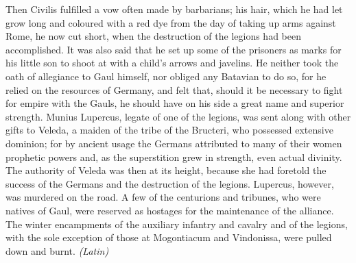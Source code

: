 
Then Civilis fulfilled a vow often made by barbarians; his hair, which he had let grow long and coloured with a red dye from the day of taking up arms against Rome, he now cut short, when the destruction of the legions had been accomplished. It was also said that he set up some of the prisoners as marks for his little son to shoot at with a child's arrows and javelins. He neither took the oath of allegiance to Gaul himself, nor obliged any Batavian to do so, for he relied on the resources of Germany, and felt that, should it be necessary to fight for empire with the Gauls, he should have on his side a great name and superior strength. Munius Lupercus, legate of one of the legions, was sent along with other gifts to Veleda, a maiden of the tribe of the Bructeri, who possessed extensive dominion; for by ancient usage the Germans attributed to many of their women prophetic powers and, as the superstition grew in strength, even actual divinity. The authority of Veleda was then at its height, because she had foretold the success of the Germans and the destruction of the legions. Lupercus, however, was murdered on the road. A few of the centurions and tribunes, who were natives of Gaul, were reserved as hostages for the maintenance of the alliance. The winter encampments of the auxiliary infantry and cavalry and of the legions, with the sole exception of those at Mogontiacum and Vindonissa, were pulled down and burnt. \emph{(Latin)}


